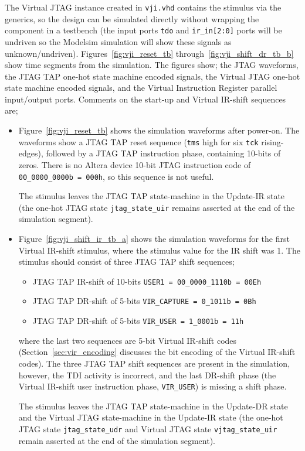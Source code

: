 \documentclass[10pt,twoside]{article}
\begin{document}
\clearpage
The Virtual JTAG instance created in \verb+vji.vhd+ contains the stimulus
via the generics, so the design can be simulated directly without
wrapping the component in a testbench (the input ports \verb+tdo+
and \verb+ir_in[2:0]+ ports will be undriven so the Modelsim simulation
will show these signals as unknown/undriven). Figures~\ref{fig:vji_reset_tb} 
through~\ref{fig:vji_shift_dr_tb_b} show time segments from
the simulation. The figures show; the JTAG waveforms, the JTAG TAP one-hot
state machine encoded signals, the Virtual JTAG one-hot state
machine encoded signals, and the Virtual Instruction Register 
parallel input/output ports. Comments on the start-up and
Virtual IR-shift sequences are;
%
\begin{itemize}
%
\item Figure~\ref{fig:vji_reset_tb} shows the simulation waveforms 
after power-on. The waveforms show a JTAG TAP reset sequence 
(\verb+tms+ high for six \verb+tck+ rising-edges), followed
by a JTAG TAP instruction phase, containing 10-bits of zeros.
There is no Altera device 10-bit JTAG instruction code of
\verb+00_0000_0000b = 000h+, so this sequence is not useful.

The stimulus leaves the JTAG TAP state-machine in the Update-IR state
(the one-hot JTAG state \verb+jtag_state_uir+ remains asserted
at the end of the simulation segment).
%
\item Figure~\ref{fig:vji_shift_ir_tb_a} shows the simulation waveforms
for the first Virtual IR-shift stimulus, where the stimulus value for the
IR shift was 1. The stimulus should consist of three JTAG TAP
shift sequences;
%
\begin{itemize}
\item JTAG TAP IR-shift of 10-bits \verb+USER1 = 00_0000_1110b = 00Eh+
\item JTAG TAP DR-shift of 5-bits \verb+VIR_CAPTURE = 0_1011b = 0Bh+
\item JTAG TAP DR-shift of 5-bits \verb+VIR_USER = 1_0001b = 11h+
\end{itemize}
%
where the last two sequences are 5-bit Virtual IR-shift codes
(Section~\ref{sec:vir_encoding} discusses the bit
encoding of the Virtual IR-shift codes).
The three JTAG TAP shift sequences are present in the simulation,
however, the TDI activity is incorrect, and the last DR-shift
phase (the Virtual IR-shift user instruction phase, \verb+VIR_USER+)
is missing a shift phase.

The stimulus leaves the JTAG TAP state-machine in the Update-DR state
and the Virtual JTAG state-machine in the Update-IR state
(the one-hot JTAG state \verb+jtag_state_udr+ and Virtual JTAG
state \verb+vjtag_state_uir+ remain asserted at the end of the
simulation segment).


\end{itemize}
\end{document}
